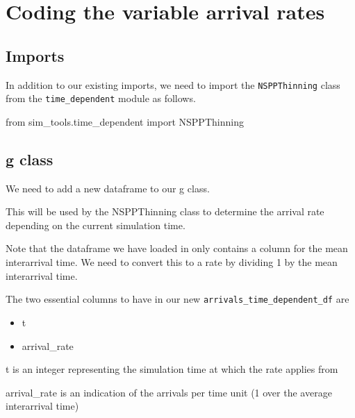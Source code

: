 \documentclass[
  letterpaper,
  DIV=11,
  numbers=noendperiod]{scrreprt}
\newenvironment{Shaded}{}{}
\newcommand{\ImportTok}[1]{\textcolor[rgb]{0.01,0.18,0.38}{#1}}
\newcommand{\NormalTok}[1]{\textcolor[rgb]{0.14,0.16,0.18}{#1}}
\providecommand{\tightlist}{%
  \setlength{\itemsep}{0pt}\setlength{\parskip}{0pt}}\usepackage{longtable,booktabs,array}
\begin{document}
\section{Coding the variable arrival
rates}\label{coding-the-variable-arrival-rates}

\subsection{Imports}\label{imports-1}

In addition to our existing imports, we need to import the
\texttt{NSPPThinning} class from the \texttt{time\_dependent} module as
follows.

\begin{Shaded}
\begin{Highlighting}[]
\ImportTok{from}\NormalTok{ sim\_tools.time\_dependent }\ImportTok{import}\NormalTok{ NSPPThinning}
\end{Highlighting}
\end{Shaded}

\subsection{g class}\label{g-class-3}

We need to add a new dataframe to our g class.

This will be used by the NSPPThinning class to determine the arrival
rate depending on the current simulation time.

Note that the dataframe we have loaded in only contains a column for the
mean interarrival time. We need to convert this to a rate by dividing 1
by the mean interarrival time.

\begin{tcolorbox}[enhanced jigsaw, colframe=quarto-callout-tip-color-frame, bottomtitle=1mm, breakable, rightrule=.15mm, coltitle=black, colbacktitle=quarto-callout-tip-color!10!white, opacityback=0, leftrule=.75mm, arc=.35mm, toptitle=1mm, title=\textcolor{quarto-callout-tip-color}{\faLightbulb}\hspace{0.5em}{Tip}, titlerule=0mm, colback=white, toprule=.15mm, bottomrule=.15mm, left=2mm, opacitybacktitle=0.6]

The two essential columns to have in our new
\texttt{arrivals\_time\_dependent\_df} are

\begin{itemize}
\tightlist
\item
  t
\item
  arrival\_rate
\end{itemize}

t is an integer representing the simulation time at which the rate
applies from

arrival\_rate is an indication of the arrivals per time unit (1 over the
average interarrival time)

\end{tcolorbox}
\end{document}
